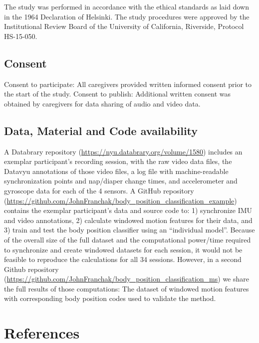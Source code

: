 \documentclass[
  man]{apa6}
\newlength{\cslhangindent}
\newlength{\cslentryspacingunit} %
\newenvironment{CSLReferences}[2] %
 {%
  \setlength{\parindent}{0pt}
  \ifodd #1
  \let\oldpar\par
  \def\par{\hangindent=\cslhangindent\oldpar}
  \fi
  \setlength{\parskip}{#2\cslentryspacingunit}
 }%
 {}
\begin{document}
The study was performed in accordance with the ethical standards as laid down in the 1964 Declaration of Helsinki. The study procedures were approved by the Institutional Review Board of the University of California, Riverside, Protocol HS-15-050.

\hypertarget{consent}{%
\subsection{Consent}\label{consent}}

Consent to participate: All caregivers provided written informed consent prior to the start of the study.
Consent to publish: Additional written consent was obtained by caregivers for data sharing of audio and video data.

\hypertarget{data-material-and-code-availability}{%
\subsection{Data, Material and Code availability}\label{data-material-and-code-availability}}

A Databrary repository (\url{https://nyu.databrary.org/volume/1580}) includes an exemplar participant's recording session, with the raw video data files, the Datavyu annotations of those video files, a log file with machine-readable synchronization points and nap/diaper change times, and accelerometer and gyroscope data for each of the 4 sensors. A GitHub repository (\url{https://github.com/JohnFranchak/body_position_classification_example}) contains the exemplar participant's data and source code to: 1) synchronize IMU and video annotations, 2) calculate windowed motion features for their data, and 3) train and test the body position classifier using an ``individual model''. Because of the overall size of the full dataset and the computational power/time required to synchronize and create windowed datasets for each session, it would not be feasible to reproduce the calculations for all 34 sessions. However, in a second Github repository (\url{https://github.com/JohnFranchak/body_position_classification_ms}) we share the full results of those computations: The dataset of windowed motion features with corresponding body position codes used to validate the method.

\newpage

\hypertarget{references}{%
\section{References}\label{references}}

\hypertarget{refs}{}
\begin{CSLReferences}{0}{0}
\end{CSLReferences}


\printbibliography
\end{document}
